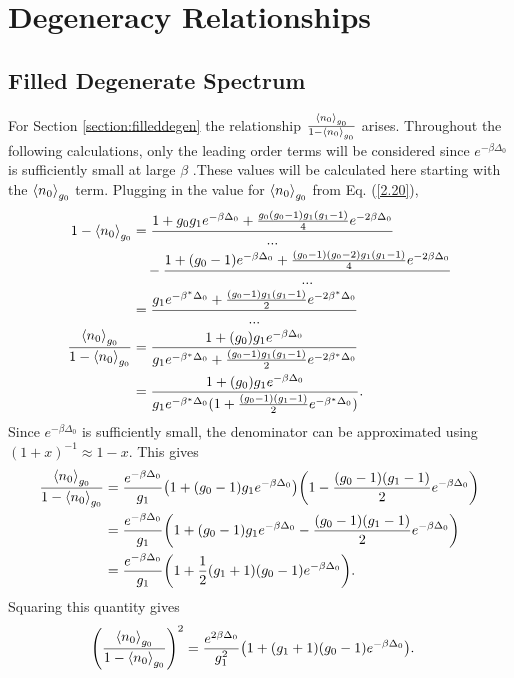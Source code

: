 \chapter{Degeneracy Relationships}
\section{Filled Degenerate Spectrum}\label{section:c1}
For Section \ref{section:filleddegen} the relationship $\frac{\left<{n_0}\right>_{g_0}}{1-\left<{n_0}\right>_{g_0}}$ arises. Throughout the following calculations, only the leading order terms will be considered since $e^{-\beta\Delta_0}$ is sufficiently small at large $\beta$ .These values will be calculated here starting with the $\left<{n_0}\right>_{g_0}$ term. Plugging in the value for $\left<{n_0}\right>_{g_0}$ from Eq. (\ref{2.20}),
\begin{align}
    1-\avg{n_0}_{g_0}&=\frac{1+g_0g_1e^{-\beta\Delta_0}+\frac{g_0(g_0-1)g_1(g_1-1)}{4}e^{-2\beta\Delta_0}}{...}\nonumber\\
    & \ \ \ -\frac{1+(g_0-1)e^{-\beta\Delta_0}+\frac{(g_0-1)(g_0-2)g_1(g_1-1)}{4} e^{-2\beta\Delta_0}}{...}\nonumber\\
    &=\frac{g_1e^{-\beta^*\Delta_0}+\frac{(g_0-1)g_1(g_1-1)}{2}e^{-2\beta^*\Delta_0}}{...}\\
    \frac{\avg{n_0}_{g_0}}{1-\avg{n_0}_{g_0}}&=\frac{1+(g_0)g_1 e^{-\beta\Delta_0}}{g_1e^{-\beta^*\Delta_0}+\frac{(g_0-1)g_1(g_1-1)}{2}e^{-2\beta^*\Delta_0}}\nonumber\\
    &=\frac{1+(g_0)g_1 e^{-\beta\Delta_0}}{g_1e^{-\beta^*\Delta_0}(1+\frac{(g_0-1)(g_1-1)}{2}e^{-\beta^*\Delta_0})}.
\end{align}
Since $e^{-\beta\Delta_0}$ is sufficiently small, the denominator can be approximated using $(1+x)^{-1}\approx 1-x$. This gives
\begin{align}
    \frac{\left<{n_0}\right>_{g_0}}{1-\left<{n_0}\right>_{g_0}}&=\frac{e^{-\beta\Delta_0}}{g_1}\qty(1+(g_0-1)g_1e^{-\beta\Delta_0})\qty(1-\frac{(g_0-1)(g_1-1)}{2}e^{-\beta\Delta_0})\nonumber\\
    &=\frac{e^{-\beta\Delta_0}}{g_1} \qty(1+(g_0-1)g_1e^{-\beta\Delta_0}-\frac{(g_0-1)(g_1-1)}{2}e^{-\beta\Delta_0})\nonumber\\
    &=\frac{e^{-\beta\Delta_0}}{g_1} \qty(1+\frac{1}{2}(g_1+1)(g_0-1) e^{-\beta\Delta_0}).
\end{align} 
Squaring this quantity gives
\begin{align}
    \qty(\frac{\left<{n_0}\right>_{g_0}}{1-\left<{n_0}\right>_{g_0}})^2&=\frac{e^{2\beta\Delta_0}}{g_1^2}\qty(1+(g_1+1)(g_0-1)e^{-\beta\Delta_0}).
\end{align}

